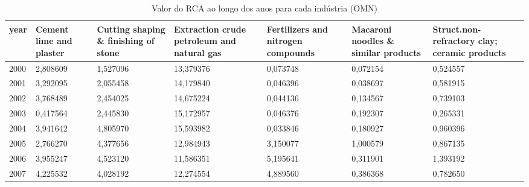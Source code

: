 \begin{table}
\centering
\caption{Valor do RCA ao longo dos anos para cada indústria (OMN)}
\begin{tabular}{p{1cm}p{2cm}p{2cm}p{2cm}p{2cm}p{2cm}p{2cm}}
\toprule
 year &  Cement lime and plaster &  Cutting shaping \& finishing of stone &  Extraction crude petroleum and natural gas &  Fertilizers and nitrogen compounds &  Macaroni noodles \& similar products &  Struct.non-refractory clay; ceramic products \\
\midrule
 2000 &                 2,808609 &                              1,527096 &                                   13,379376 &                            0,073748 &                             0,072154 &                                      0,524557 \\
 2001 &                 3,292095 &                              2,055458 &                                   14,179840 &                            0,046396 &                             0,038697 &                                      0,581915 \\
 2002 &                 3,768489 &                              2,454025 &                                   14,675224 &                            0,044136 &                             0,134567 &                                      0,739103 \\
 2003 &                 0,417564 &                              2,445830 &                                   15,172957 &                            0,046376 &                             0,192307 &                                      0,265331 \\
 2004 &                 3,941642 &                              4,805970 &                                   15,593982 &                            0,033846 &                             0,180927 &                                      0,960396 \\
 2005 &                 2,766270 &                              4,377656 &                                   12,984943 &                            3,150077 &                             1,000579 &                                      0,867135 \\
 2006 &                 3,955247 &                              4,523120 &                                   11,586351 &                            5,195641 &                             0,311901 &                                      1,393192 \\
 2007 &                 4,225532 &                              4,028192 &                                   12,274554 &                            4,889560 &                             0,386368 &                                      0,782650 \\

\end{tabular}
\end{table}
